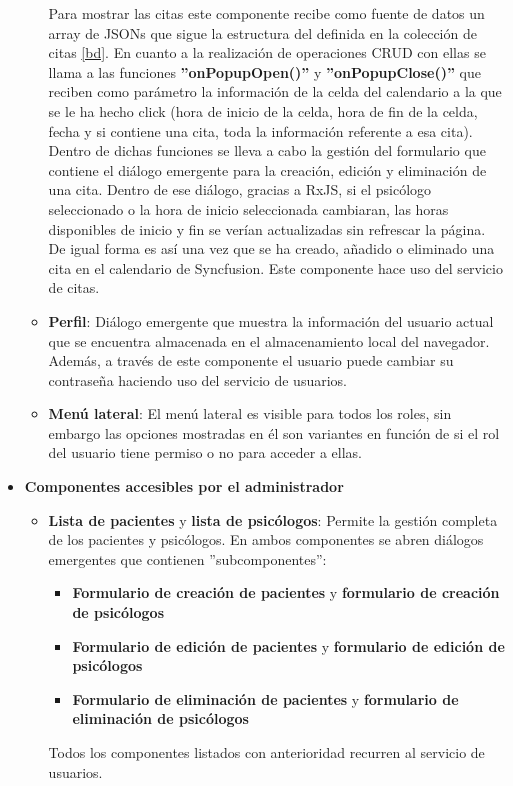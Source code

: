 \begin{itemize}
\begin{itemize}
        Para mostrar las citas este componente recibe como fuente de datos un array de JSONs que sigue la estructura del definida en la colección de citas \ref{bd}. En cuanto a la realización de operaciones CRUD con ellas se llama a las funciones \textbf{''onPopupOpen()''} y \textbf{''onPopupClose()''} que reciben como parámetro la información de la celda del calendario a la que se le ha hecho click (hora de inicio de la celda, hora de fin de la celda, fecha y si contiene una cita, toda la información referente a esa cita). Dentro de dichas funciones se lleva a cabo la gestión del formulario que contiene el diálogo emergente para la creación, edición y eliminación de una cita. Dentro de ese diálogo, gracias a RxJS, si el psicólogo seleccionado o la hora de inicio seleccionada cambiaran, las horas disponibles de inicio y fin se verían actualizadas sin refrescar la página. De igual forma es así una vez que se ha creado, añadido o eliminado una cita en el calendario de Syncfusion.
        Este componente hace uso del servicio de citas.
        \item \textbf{Perfil}: Diálogo emergente que muestra la información del usuario actual que se encuentra almacenada en el almacenamiento local del navegador. Además, a través de este componente el usuario puede cambiar su contraseña haciendo uso del servicio de usuarios.
        \item \textbf{Menú lateral}: El menú lateral es visible para todos los roles, sin embargo las opciones mostradas en él son variantes en función de si el rol del usuario tiene permiso o no para acceder a ellas.
    \end{itemize}
    \item \textbf{Componentes accesibles por el administrador}
    \begin{itemize}
        \item \textbf{Lista de pacientes} y \textbf{lista de psicólogos}: Permite la gestión completa de los pacientes y psicólogos. En ambos componentes se abren diálogos emergentes que contienen ''subcomponentes'':
        \begin{itemize}
            \item \textbf{Formulario de creación de pacientes} y \textbf{formulario de creación de psicólogos}
            \item \textbf{Formulario de edición de pacientes} y \textbf{formulario de edición de psicólogos}
            \item \textbf{Formulario de eliminación de pacientes} y \textbf{formulario de eliminación de psicólogos}
        \end{itemize}
        Todos los componentes listados con anterioridad recurren al servicio de usuarios. 
        

\end{itemize}
\end{itemize}
